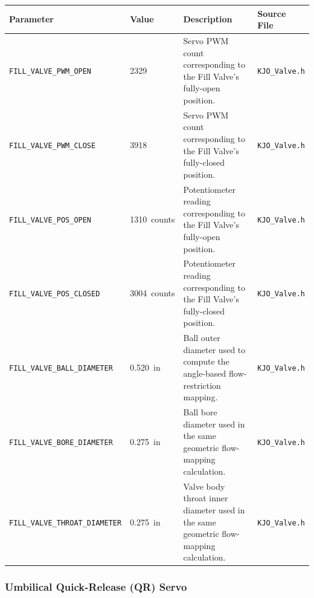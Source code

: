 ﻿\documentclass[11pt,letterpaper]{article}
\begin{document}
\begingroup
\footnotesize
\begin{longtable}{@{}p{3.2cm}p{2.4cm}p{6.2cm}p{2.6cm}@{}}
\toprule
Parameter & Value & Description & Source File \\
\midrule
\texttt{FILL\_\allowbreak VALVE\_\allowbreak PWM\_\allowbreak OPEN} & 2329 & Servo PWM count corresponding to the Fill Valve's fully-open position. & \texttt{KJO\_\allowbreak Valve.h} \\
\texttt{FILL\_\allowbreak VALVE\_\allowbreak PWM\_\allowbreak CLOSE} & 3918 & Servo PWM count corresponding to the Fill Valve's fully-closed position. & \texttt{KJO\_\allowbreak Valve.h} \\
\texttt{FILL\_\allowbreak VALVE\_\allowbreak POS\_\allowbreak OPEN} & 1310~counts & Potentiometer reading corresponding to the Fill Valve's fully-open position. & \texttt{KJO\_\allowbreak Valve.h} \\
\texttt{FILL\_\allowbreak VALVE\_\allowbreak POS\_\allowbreak CLOSED} & 3004~counts & Potentiometer reading corresponding to the Fill Valve's fully-closed position. & \texttt{KJO\_\allowbreak Valve.h} \\
\texttt{FILL\_\allowbreak VALVE\_\allowbreak BALL\_\allowbreak DIAMETER} & 0.520~in & Ball outer diameter used to compute the angle-based flow-restriction mapping. & \texttt{KJO\_\allowbreak Valve.h} \\
\texttt{FILL\_\allowbreak VALVE\_\allowbreak BORE\_\allowbreak DIAMETER} & 0.275~in & Ball bore diameter used in the same geometric flow-mapping calculation. & \texttt{KJO\_\allowbreak Valve.h} \\
\texttt{FILL\_\allowbreak VALVE\_\allowbreak THROAT\_\allowbreak DIAMETER} & 0.275~in & Valve body throat inner diameter used in the same geometric flow-mapping calculation. & \texttt{KJO\_\allowbreak Valve.h} \\
\end{longtable}
\endgroup

\subsubsection*{Umbilical Quick-Release (QR) Servo}
\end{document}

